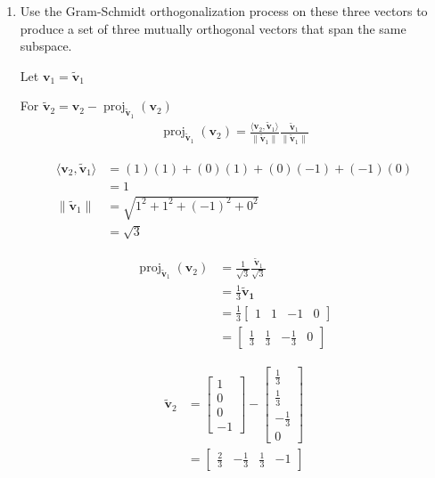 \documentclass{tufte-book}
\DeclareMathOperator{\proj}{proj}
\newcommand{\vct}{\mathbf}
\newcommand{\dprod}[2]{\langle #1, #2 \rangle}
\theoremstyle{mytheoremstyle}
\theoremstyle{mylemstyle}
\theoremstyle{mydefstyle}
\begin{document}
\begin{enumerate}
\item Use the Gram-Schmidt orthogonalization process on these three vectors to produce a set of three mutually orthogonal vectors that span the same subspace.

Let $\vct{v}_1 = \vct{\tilde{v}}_1$

For $\vct{\tilde{v}}_2 = \vct{v}_2 - \proj_{\vct{\tilde{v}}_1}(\vct{v}_2)$
\begin{align*}
\proj_{\vct{\tilde{v}}_1}(\vct{v}_2) = \frac{\dprod{\vct{v}_2}{\vct{\tilde{v}}_1}}{\|\vct{\tilde{v}}_1\|}\frac{\vct{\tilde{v}}_1}{\|\vct{\tilde{v}}_1\|}
\end{align*}

\begin{align*}
\dprod{\vct{v}_2}{\vct{\tilde{v}}_1} &= (1)(1) + (0)(1) + (0)({-1}) +(-1)(0)\\
&=1 \\
\|\vct{\tilde{v}}_1\| &= \sqrt{1^2+1^2+(-1)^2+0^2} \\
&= \sqrt{3}
\end{align*}

\begin{align*}
\proj_{\vct{\tilde{v}}_1}(\vct{v}_2) &= \frac{1}{\sqrt{3}}\frac{\vct{\tilde{v}}_1}{\sqrt{3}}\\
&= \frac{1}{3}\vct{\tilde{v}_1}\\
&= \frac{1}{3}
\begin{bmatrix}
1&1&-1&0
\end{bmatrix} \\
&=
\begin{bmatrix}
\frac{1}{3} & \frac{1}{3} &-\frac{1}{3} & 0
\end{bmatrix}
\end{align*}

\begin{align*}
\vct{\tilde{v}}_2 &=
\begin{bmatrix}
1 \\
0 \\
0 \\
-1
\end{bmatrix}
-
\begin{bmatrix}
\frac{1}{3} \\
\frac{1}{3} \\
{-\frac{1}{3}} \\
0
\end{bmatrix} \\
&=
\begin{bmatrix}
\frac{2}{3} & -\frac{1}{3} &\frac{1}{3} & -1
\end{bmatrix}
\end{align*}



\end{enumerate}
\end{document}
